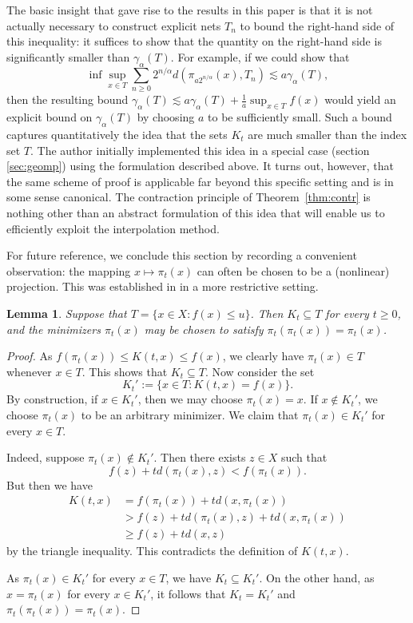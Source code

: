 \documentclass[10pt,reqno]{amsart}
\newtheorem{lem}[thm]{Lemma}
\theoremstyle{definition}
\numberwithin{equation}{section}
\numberwithin{figure}{section}
\numberwithin{table}{section}
\begin{document}
The basic insight that gave rise to the results in this paper is that it 
is not actually necessary to construct explicit nets $T_n$ to bound the 
right-hand side of this inequality: it suffices to show that the quantity 
on the right-hand side is significantly smaller than $\gamma_\alpha(T)$.
For example, if we could show that
$$
	\inf \sup_{x\in T}
	\sum_{n\ge 0}2^{n/\alpha}d(\pi_{a2^{n/\alpha}}(x),T_n)
	\lesssim a\gamma_\alpha(T),
$$
then the resulting bound $\gamma_\alpha(T) \lesssim a\gamma_\alpha(T)+ 
\frac{1}{a}\sup_{x\in T}f(x)$ would yield an explicit bound on 
$\gamma_\alpha(T)$ by choosing $a$ to be sufficiently small. Such a bound 
captures quantitatively the idea that the sets $K_t$ are much smaller than 
the index set $T$. The author initially implemented this idea
in a special case (section \ref{sec:geomp}) using the formulation 
described above. It turns out, however, that the same scheme of proof is 
applicable far beyond this specific setting and is in some sense 
canonical. The contraction principle of Theorem~\ref{thm:contr} is nothing 
other than an abstract formulation of this idea that will enable us to
efficiently exploit the interpolation method.

For future reference, we conclude this section by recording a convenient 
observation: the mapping $x\mapsto\pi_t(x)$ can often be chosen to be 
a (nonlinear) projection. This was established in \cite{vH16a} in a more 
restrictive setting.

\begin{lem}
\label{lem:proj}
Suppose that $T=\{x\in X:f(x)\le u\}$. Then $K_t\subseteq T$ for every 
$t\ge 0$, and the minimizers $\pi_t(x)$ may be chosen to satisfy 
$\pi_t(\pi_t(x))=\pi_t(x)$.
\end{lem}

\begin{proof}
As $f(\pi_t(x))\le K(t,x)\le f(x)$, we clearly have $\pi_t(x)\in T$ 
whenever $x\in T$. This shows that $K_t\subseteq T$. Now consider the set
$$
	K_t' := \{x\in T:K(t,x)=f(x)\}.
$$
By construction, if $x\in K_t'$, then we may choose $\pi_t(x)=x$.
If $x\not\in K_t'$, we choose $\pi_t(x)$ to be an arbitrary minimizer.
We claim that $\pi_t(x)\in K_t'$ for every $x\in T$. 

Indeed, suppose $\pi_t(x)\not\in K_t'$. Then there exists $z\in X$ such 
that
$$
	f(z)+td(\pi_t(x),z) < f(\pi_t(x)).
$$
But then we have
\begin{align*}
	K(t,x) &= f(\pi_t(x)) + td(x,\pi_t(x)) \\
	&> f(z) + td(\pi_t(x),z) + td(x,\pi_t(x)) \\
	&\ge f(z) + td(x,z)
\end{align*}
by the triangle inequality. This contradicts the definition of $K(t,x)$.

As $\pi_t(x)\in K_t'$ for every $x\in T$, we have $K_t\subseteq K_t'$. On 
the other hand, as $x=\pi_t(x)$ for every $x\in K_t'$, it follows that 
$K_t=K_t'$ and $\pi_t(\pi_t(x))=\pi_t(x)$.
\end{proof}
\end{document}
